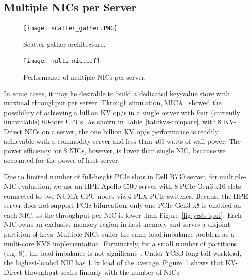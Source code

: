 \subsection{Multiple NICs per Server}

\begin{figure}[t]
\begin{minipage}[t]{0.23\textwidth}
\centering
\texttt{[image: scatter\_gather.PNG]}
\caption{Scatter-gather architecture.}
\label{fig:sg-arch}
\end{minipage}
\begin{minipage}[t]{0.23\textwidth}
\centering
\texttt{[image: multi\_nic.pdf]}
\caption{Performance of multiple NICs per server.}
\label{fig:multiple-nics}
\end{minipage}
\vspace{-10pt}
\end{figure}

In some cases, it may be desirable to build a dedicated key-value store with maximal throughput per server.
Through simulation, MICA~\cite{li2016full} showed the possibility of achieving a billion KV op/s in a single server with four (currently unavailable) 60-core CPUs.
As shown in Table~\ref{tab:kvs-compare}, with 8 KV-Direct NICs on a server, the one billion KV op/s performance is readily achievable with a commodity server and less than 400 watts of wall power.
The power efficiency for 8 NICs, however, is lower than single NIC, because we accounted for the power of host server.

Due to limited number of full-height PCIe slots in Dell R730 server, for multiple-NIC evaluation, we use an HPE Apollo 6500 server with 8 PCIe Gen3 x16 slots connected to two NUMA CPU nodes via 4 PLX PCIe switches.
Because the HPE server does not support PCIe bifurcation, only one PCIe Gen3 x8 is enabled on each NIC, so the throughput per NIC is lower than Figure~\ref{fig:ycsb-tput}.
Each NIC owns an exclusive memory region in host memory and serves a disjoint partition of keys.
Multiple NICs suffer the same load imbalance problem as a multi-core KVS implementation.
Fortunately, for a small number of partitions (e.g. 8), the load imbalance is not significant~\cite{li2016full}. Under YCSB long-tail workload, the highest-loaded NIC has 1.4x load of the average.
Figure~\ref{fig:multiple-nics} shows that KV-Direct throughput scales linearly with the number of NICs.
